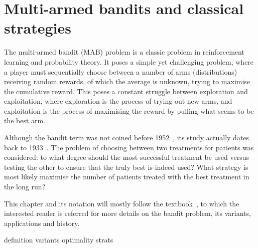 \chapter{Multi-armed bandits and classical strategies}
\label{chap:bandits}

The multi-armed bandit (MAB) problem is a classic problem in reinforcement learning and probability theory.
It poses a simple yet challenging problem, where a player must sequentially choose between a number of arms (distributions) receiving random rewards, of which the average is unknown, trying to maximise the cumulative reward.
This poses a constant struggle between exploration and exploitation, where exploration is the process of trying out new arms, and exploitation is the process of maximising the reward by pulling what seems to be the best arm.

Although the bandit term was not coined before 1952~\autocite{robbins1952}, its study actually dates back to 1933~\autocite{thompson1933}.
The problem of choosing between two treatments for patients was considered: to what degree should the most successful treatment be used versus testing the other to ensure that the truly best is indeed used?
What strategy is most likely maximise the number of patients treated with the best treatment in the long run?

This chapter and its notation will mostly follow the textbook~\autocite{lattimore2020}, to which the interested reader is referred for more details on the bandit problem, its variants, applications and history.


{definition}
{variants}
{optimality}
{strats}
